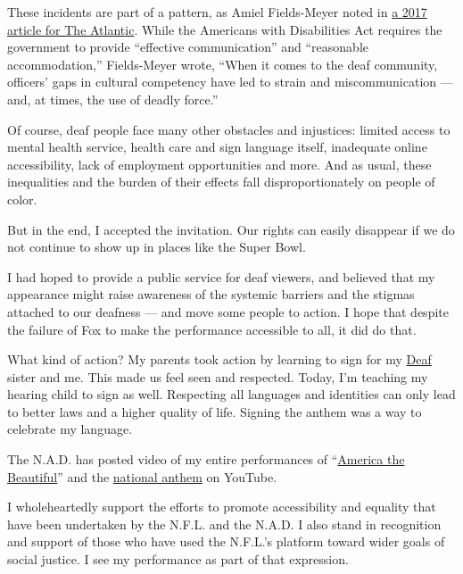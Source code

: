 These incidents are part of a pattern, as Amiel Fields-Meyer noted in
\href{https://www.theatlantic.com/politics/archive/2017/09/the-steadily-problematic-interactions-between-deaf-americans-and-police/541083/}{a
2017 article for The Atlantic}. While the Americans with Disabilities
Act requires the government to provide ``effective communication'' and
``reasonable accommodation,'' Fields-Meyer wrote, ``When it comes to the
deaf community, officers' gaps in cultural competency have led to strain
and miscommunication --- and, at times, the use of deadly force.''

Of course, deaf people face many other obstacles and injustices: limited
access to mental health service, health care and sign language itself,
inadequate online accessibility, lack of employment opportunities and
more. And as usual, these inequalities and the burden of their effects
fall disproportionately on people of color.

But in the end, I accepted the invitation. Our rights can easily
disappear if we do not continue to show up in places like the Super
Bowl.

I had hoped to provide a public service for deaf viewers, and believed
that my appearance might raise awareness of the systemic barriers and
the stigmas attached to our deafness --- and move some people to action.
I hope that despite the failure of Fox to make the performance
accessible to all, it did do that.

What kind of action? My parents took action by learning to sign for my
\href{https://www.nad.org/resources/american-sign-language/community-and-culture-frequently-asked-questions/}{Deaf}
sister and me. This made us feel seen and respected. Today, I'm teaching
my hearing child to sign as well. Respecting all languages and
identities can only lead to better laws and a higher quality of life.
Signing the anthem was a way to celebrate my language.

The N.A.D. has posted video of my entire performances of
``\href{https://www.youtube.com/watch?v=EmXFzQo4BFw\&feature=youtu.be}{America
the Beautiful}'' and the
\href{https://www.youtube.com/watch?v=c2TCT5HYlHQ\&feature=youtu.be}{national
anthem} on YouTube.

I wholeheartedly support the efforts to promote accessibility and
equality that have been undertaken by the N.F.L. and the N.A.D. I also
stand in recognition and support of those who have used the N.F.L.'s
platform toward wider goals of social justice. I see my performance as
part of that expression.

